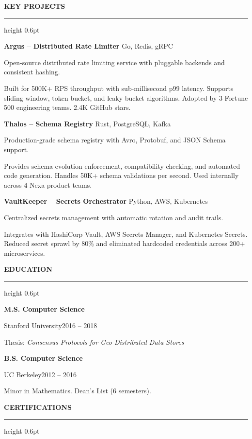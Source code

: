 \documentclass[11pt,a4paper]{article}
\newcommand{\tsection}[1]{%
  \vspace{6pt}
  {\large\bfseries\color{terminalDark}#1}
  \vspace{2pt}
  \hrule height 0.6pt
  \vspace{4pt}
}
\newcommand{\projectentry}[4]{%
  \vspace{2pt}
  {\bfseries\color{terminalDark}#1} \hfill {\color{terminalGray}\footnotesize#2}\par
  {\color{terminalCyan}\footnotesize#3}\par
  \vspace{1pt}
  #4\par
}
\begin{document}
\begin{minipage}[t]{0.40\textwidth}
\tsection{KEY PROJECTS}

\projectentry{Argus -- Distributed Rate Limiter}{Go, Redis, gRPC}{%
  Open-source distributed rate limiting service with pluggable backends and consistent hashing.
}{%
  Built for 500K+ RPS throughput with sub-millisecond p99 latency. Supports sliding window, token bucket, and leaky bucket algorithms. Adopted by 3 Fortune 500 engineering teams. 2.4K GitHub stars.
}

\vspace{4pt}

\projectentry{Thalos -- Schema Registry}{Rust, PostgreSQL, Kafka}{%
  Production-grade schema registry with Avro, Protobuf, and JSON Schema support.
}{%
  Provides schema evolution enforcement, compatibility checking, and automated code generation. Handles 50K+ schema validations per second. Used internally across 4 Nexa product teams.
}

\vspace{4pt}

\projectentry{VaultKeeper -- Secrets Orchestrator}{Python, AWS, Kubernetes}{%
  Centralized secrets management with automatic rotation and audit trails.
}{%
  Integrates with HashiCorp Vault, AWS Secrets Manager, and Kubernetes Secrets. Reduced secret sprawl by 80\% and eliminated hardcoded credentials across 200+ microservices.
}

\tsection{EDUCATION}

\vspace{3pt}
{\bfseries\color{terminalDark}M.S. Computer Science}\par
{\color{terminalGreen}Stanford University}\hfill{\color{terminalGray}\footnotesize 2016 -- 2018}\par
\vspace{1pt}
Thesis: \textit{Consensus Protocols for Geo-Distributed Data Stores}\par
\vspace{4pt}

{\bfseries\color{terminalDark}B.S. Computer Science}\par
{\color{terminalGreen}UC Berkeley}\hfill{\color{terminalGray}\footnotesize 2012 -- 2016}\par
\vspace{1pt}
Minor in Mathematics. Dean's List (6 semesters).

\tsection{CERTIFICATIONS}


\end{minipage}
\end{document}
